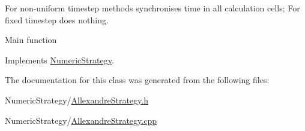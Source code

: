 For non-\/uniform timestep methods synchronises time in all calculation cells; For fixed timestep does nothing. 

Main function 

Implements \hyperlink{class_numeric_strategy_a5dec2aaf22a9642fdd92b55c12353f82}{Numeric\+Strategy}.



The documentation for this class was generated from the following files\+:\begin{DoxyCompactItemize}
\item 
Numeric\+Strategy/\hyperlink{_allexandre_strategy_8h}{Allexandre\+Strategy.\+h}\item 
Numeric\+Strategy/\hyperlink{_allexandre_strategy_8cpp}{Allexandre\+Strategy.\+cpp}\end{DoxyCompactItemize}
